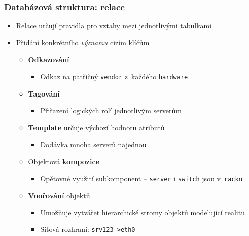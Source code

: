 \documentclass{beamer}
\begin{document}
\begin{frame}[fragile]
\frametitle{Databázová struktura: relace}
\begin{itemize}
    \item Relace určují pravidla pro vztahy mezi jednotlivými tabulkami
    \item Přidání konkrétního {\em významu} cizím klíčům
        \begin{itemize}
            \item {\bf Odkazování}
                \begin{itemize}
                    \item Odkaz na patřičný {\tt vendor} z~každého {\tt hardware}
                \end{itemize}
            \item {\bf Tagování}
                \begin{itemize}
                    \item Přiřazení logických rolí jednotlivým serverům
                \end{itemize}
            \item {\bf Template} určuje výchozí hodnotu atributů
                \begin{itemize}
                    \item Dodávka mnoha serverů najednou
                \end{itemize}
            \item Objektová {\bf kompozice}
                \begin{itemize}
                    \item Opětovné využití subkomponent -- {\tt server} i {\tt switch} jsou v~{\tt rack}u
                \end{itemize}
            \item {\bf Vnořování} objektů
                \begin{itemize}
                    \item Umožňuje vytvářet hierarchické stromy objektů modelující realitu
                    \item Síťová rozhraní: {\tt srv123->eth0}
                \end{itemize}
        \end{itemize}
\end{itemize}
\end{frame}
\end{document}
